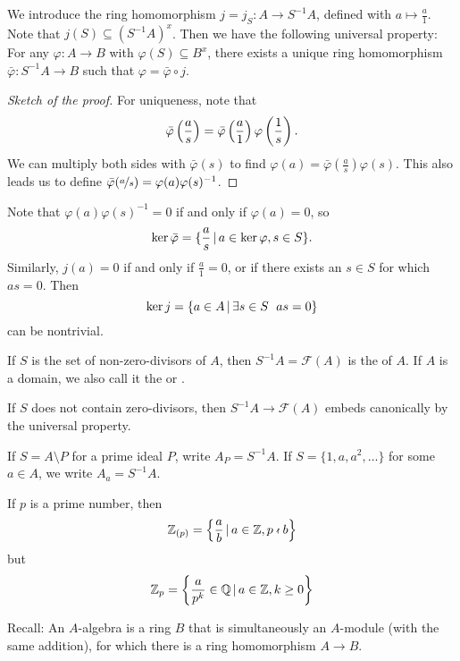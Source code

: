We introduce the ring homomorphism $j = j_S: A \to S^{-1} A$, defined with $a
\mapsto \frac{a}{1}$.
Note that $j(S) \subseteq (S^{-1} A)^x$.
Then we have the following universal property:
For any $\varphi: A \to B$ with $\varphi(S) \subseteq B^x$, there exists a
unique ring homomorphism $\bar{\varphi}: S^{-1} A \to B$ such that $\varphi =
\bar{\varphi} \circ j$.

\begin{proof}[Sketch of the proof]
  For uniqueness, note that
  \[
	\bar{\varphi}\left( \frac{a}{s} \right)
	= \bar{\varphi}\left( \frac{a}{1} \right) \varphi\left( \frac{1}{s} \right).
  \]
  We can multiply both sides with $\bar{\varphi}(s)$ to find $\varphi(a) =
  \bar{\varphi}\left( \frac{a}{s} \right) \varphi(s)$.
  This also leads us to define $\bar{\varphi}(\nicefrac{a}{s}) = \varphi(a)
  \varphi(s)^{-1}$.
\end{proof}

Note that $\varphi(a) \varphi(s)^{-1} = 0$ if and only if $\varphi(a) = 0$, so
\[
  \operatorname{ker} \bar{\varphi} = \{ \frac{a}{s} \,|\, a \in \operatorname{ker} \varphi, s \in S \}.
\]
Similarly, $j(a) = 0$ if and only if $\frac{a}{1} = 0$, or if there exists an $s
\in S$ for which $as = 0$.
Then
\[
  \operatorname{ker} j = \{ a \in A \,|\, \exists s \in S \;\  as = 0 \}
\]
can be nontrivial.

\begin{definition}
  If $S$ is the set of non-zero-divisors of $A$, then $S^{-1} A =
  \mathcal{F}(A)$ is the  of $A$.
  If $A$ is a domain, we also call it the  or
  .
\end{definition}

If $S$ does not contain zero-divisors, then $S^{-1} A \to \mathcal{F}(A)$ embeds
canonically by the universal property.

\begin{definition}
  If $S = A \setminus P$ for a prime ideal $P$, write $A_P = S^{-1} A$.
  If $S = \{1, a, a^2, \ldots\}$ for some $a \in A$, we write $A_a = S^{-1} A$.
\end{definition}

\begin{example}
  If $p$ is a prime number, then
  \[
	\mathbb{Z}_{(p)} = \left\{ \frac{a}{b} \,|\, a \in \mathbb{Z}, p \nshortmid b \right\}
  \]
  but
  \[
	\mathbb{Z}_p = \left\{
	  \frac{a}{p^k} \in \mathbb{Q} \,|\, a \in \mathbb{Z}, k \ge 0
	\right\}
  \]
\end{example}

Recall:
An $A$-algebra is a ring $B$ that is simultaneously an $A$-module (with the same
addition), for which there is a ring homomorphism $A \to B$.

